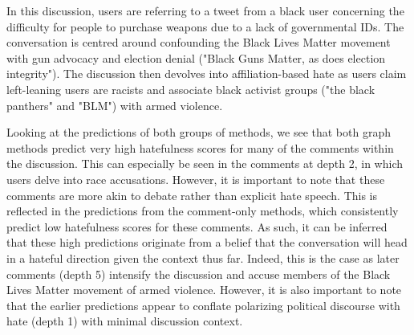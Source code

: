\documentclass[letterpaper]{article} %
\begin{document}
In this discussion, users are referring to a tweet from a black user concerning the difficulty for people to purchase weapons due to a lack of governmental IDs. The conversation is centred around confounding the Black Lives Matter movement with gun advocacy and election denial ("Black Guns Matter, as does election integrity"). The discussion then devolves into affiliation-based hate as users claim left-leaning users are racists and associate black activist groups ("the black panthers" and "BLM") with armed violence.

Looking at the predictions of both groups of methods, we see that both graph methods predict very high hatefulness scores for many of the comments within the discussion. This can especially be seen in the comments at depth 2, in which users delve into race accusations. However, it is important to note that these comments are more akin to debate rather than explicit hate speech. This is reflected in the predictions from the comment-only methods, which consistently predict low hatefulness scores for these comments. As such, it can be inferred that these high predictions originate from a belief that the conversation will head in a hateful direction given the context thus far. Indeed, this is the case as later comments (depth 5) intensify the discussion and accuse members of the Black Lives Matter movement of armed violence. However, it is also important to note that the earlier predictions appear to conflate polarizing political discourse with hate (depth 1) with minimal discussion context.
\end{document}
